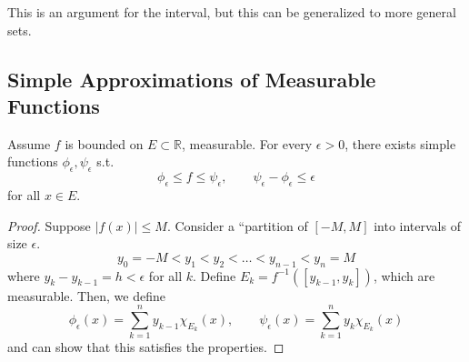   This is an argument for the interval, but this can be generalized to more general sets. 

\subsection{Simple Approximations of Measurable Functions}

  \begin{lemma}
    Assume $f$ is bounded on $E \subset \mathbb{R}$, measurable. For every $\epsilon > 0$, there exists simple functions $\phi_\epsilon, \psi_\epsilon$ s.t. 
    \begin{equation}
      \phi_\epsilon \leq f \leq \psi_\epsilon, \qquad \psi_\epsilon - \phi_\epsilon \leq \epsilon
    \end{equation}
    for all $x \in E$. 
  \end{lemma}
  \begin{proof}
    Suppose $|f(x)| \leq M$. Consider a ``partition of $[-M, M]$ into intervals of size $\epsilon$. 
    \begin{equation}
      y_0 = -M < y_1 < y_2 < \ldots < y_{n-1} < y_n = M
    \end{equation}
    where $y_k - y_{k-1} = h < \epsilon$ for all $k$. Define $E_k = f^{-1} ([y_{k-1}, y_k])$, which are measurable. Then, we define 
    \begin{equation}
      \phi_\epsilon(x) = \sum_{k=1}^n y_{k-1} \chi_{E_k} (x) , \qquad \psi_\epsilon (x) = \sum_{k=1}^n y_k \chi_{E_k} (x) 
    \end{equation}
    and can show that this satisfies the properties. 
  \end{proof}

